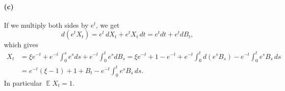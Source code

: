 \documentclass[a4paper,11pt]{article}
\theoremstyle{definition}
\theoremstyle{plain}
\theoremstyle{remark}
\DeclareMathOperator*{\expval}{\mathbb{E}}
\begin{document}
\paragraph*{(c)}

If we multiply both sides by $e^t$, we get
$$
d(e^tX_t) = e^t\,dX_t + e^tX_t\,dt = e^tdt + e^tdB_t,
$$
which gives
\begin{align*}
X_t & = \xi e^{-t} + e^{-t}\int_0^se^sds + e^{-t}\int_0^te^sdB_s
= \xi e^{-t} + 1 - e^{-t} + e^{-t}\int_0^td(e^sB_s) - e^{-t}\int_0^t e^sB_s\,ds \\ & = e^{-t}(\xi -1) + 1 + B_t - e^{-t}\int_0^t e^sB_s\,ds.
\end{align*}
In particular $\expval X_t = 1$.
\end{document}
